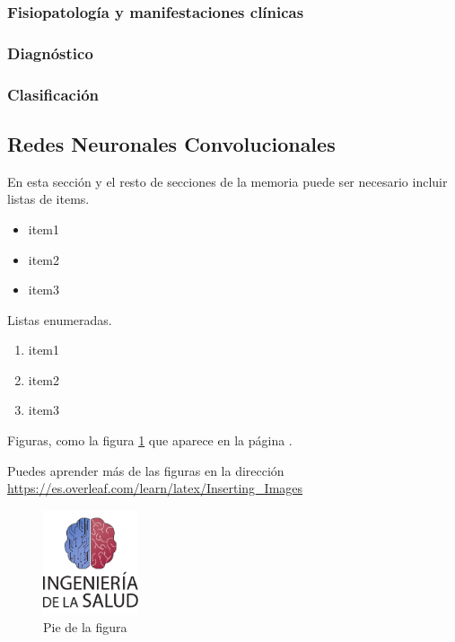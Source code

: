 \subsubsection{Fisiopatología y manifestaciones clínicas}

\titlespacing{\subsubsection}{0pt}{0.25cm}{0.1cm}
\subsubsection{Diagnóstico}

\titlespacing{\subsubsection}{0pt}{0.25cm}{0.1cm}
\subsubsection{Clasificación}


\subsection{Redes Neuronales Convolucionales}

En esta sección y el resto de secciones de la memoria puede ser necesario incluir listas de items.

\begin{itemize}
    \item item1
    \item item2
    \item item3
\end{itemize}

Listas enumeradas.

\begin{enumerate}
    \item item1
    \item item2
    \item item3
\end{enumerate}

Figuras, como la figura \ref{fig:escudo} que aparece en la página \pageref{fig:escudo}. 

Puedes aprender más de las figuras en la dirección \url{https://es.overleaf.com/learn/latex/Inserting_Images}

\begin{figure}[h]
    \centering
    \includegraphics[width=0.25\textwidth]{img/escudoSalud.pdf}
    \caption{Pie de la figura}
    \label{fig:escudo}
\end{figure}


